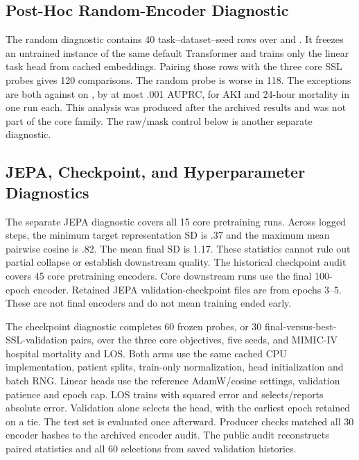\subsection{Post-Hoc Random-Encoder Diagnostic}
\label{app:random}

The random diagnostic contains 40 task--dataset--seed rows over \MIMIC{} and \EICU{}. It freezes an untrained instance of the same default Transformer and trains only the linear task head from cached embeddings. Pairing those rows with the three core SSL probes gives 120 comparisons. The random probe is worse in 118. The exceptions are both against \JEPA{} on \EICU{}, by at most .001 AUPRC, for AKI and 24-hour mortality in one run each. This analysis was produced after the archived results and was not part of the core family. The raw/mask control below is another separate diagnostic.


\subsection{JEPA, Checkpoint, and Hyperparameter Diagnostics}
\label{app:diagnostics}

The separate JEPA diagnostic covers all 15 core pretraining runs. Across logged steps, the minimum target representation SD is .37 and the maximum mean pairwise cosine is .82. The mean final SD is 1.17. These statistics cannot rule out partial collapse or establish downstream quality. The historical checkpoint audit covers 45 core pretraining encoders. Core downstream runs use the final 100-epoch encoder. Retained JEPA validation-checkpoint files are from epochs 3--5. These are not final encoders and do not mean training ended early.

The checkpoint diagnostic completes 60 frozen probes, or 30 final-versus-best-SSL-validation pairs, over the three core objectives, five seeds, and MIMIC-IV hospital mortality and LOS. Both arms use the same cached CPU implementation, patient splits, train-only normalization, head initialization and batch RNG. Linear heads use the reference AdamW/cosine settings, validation patience and epoch cap. LOS trains with squared error and selects/reports absolute error. Validation alone selects the head, with the earliest epoch retained on a tie. The test set is evaluated once afterward. Producer checks matched all 30 encoder hashes to the archived encoder audit. The public audit reconstructs paired statistics and all 60 selections from saved validation histories.

\begin{table}[htbp]
{\caption{Separate MIMIC-IV cached CPU probe diagnostic. Mean $\pm$ sample SD over five seeds. Mortality uses AUPRC. LOS uses absolute error in days. $\Delta$ is best-SSL-validation minus rerun-final. Brackets give the observed paired range. These final-arm values are reruns, not substituted historical scores.}}
{\scriptsize}
\end{table}


